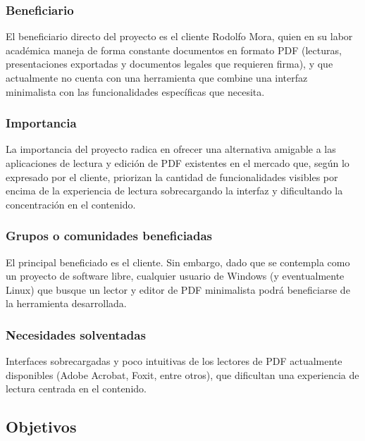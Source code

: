 \subsubsection{Beneficiario}
El beneficiario directo del proyecto es el cliente Rodolfo Mora, quien en su labor académica maneja de forma constante documentos en formato PDF (lecturas, presentaciones exportadas y documentos legales que requieren firma), y que actualmente no cuenta con una herramienta
que combine una interfaz minimalista con las funcionalidades específicas que necesita.

\subsubsection{Importancia}
La importancia del proyecto radica en ofrecer una alternativa amigable a las aplicaciones de lectura y edición de PDF existentes en el mercado que, según lo expresado por el cliente, priorizan la cantidad de funcionalidades visibles por encima de la experiencia de lectura sobrecargando la interfaz y dificultando la concentración en el contenido. 

\subsubsection{Grupos o comunidades beneficiadas}

El principal beneficiado es el cliente. Sin embargo, dado que se contempla como un proyecto de software libre, cualquier usuario de Windows (y eventualmente Linux) que busque un lector y editor de PDF minimalista podrá beneficiarse de la herramienta desarrollada.

\subsubsection{Necesidades solventadas}

Interfaces sobrecargadas y poco intuitivas de los lectores de PDF actualmente disponibles (Adobe Acrobat, Foxit, entre otros), que dificultan una experiencia de lectura centrada en el contenido.
	

\subsection{Objetivos}

%

